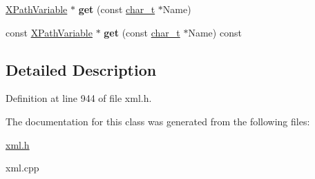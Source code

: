 \begin{DoxyCompactItemize}
\item 
\hypertarget{classphys_1_1xml_1_1XPathVariableSet_ab84e282b7148b93254b60dc8af3392a9}{
\hyperlink{classphys_1_1xml_1_1XPathVariable}{XPathVariable} $\ast$ {\bfseries get} (const \hyperlink{namespacephys_1_1xml_afc87705cd1c2917d87b879715a2d8f6e}{char\_\-t} $\ast$Name)}
\label{df/dd1/classphys_1_1xml_1_1XPathVariableSet_ab84e282b7148b93254b60dc8af3392a9}

\item 
\hypertarget{classphys_1_1xml_1_1XPathVariableSet_a08ba31f8616da275915810d876c98324}{
const \hyperlink{classphys_1_1xml_1_1XPathVariable}{XPathVariable} $\ast$ {\bfseries get} (const \hyperlink{namespacephys_1_1xml_afc87705cd1c2917d87b879715a2d8f6e}{char\_\-t} $\ast$Name) const }
\label{df/dd1/classphys_1_1xml_1_1XPathVariableSet_a08ba31f8616da275915810d876c98324}

\end{DoxyCompactItemize}


\subsection{Detailed Description}


Definition at line 944 of file xml.h.



The documentation for this class was generated from the following files:\begin{DoxyCompactItemize}
\item 
\hyperlink{xml_8h}{xml.h}\item 
xml.cpp\end{DoxyCompactItemize}
